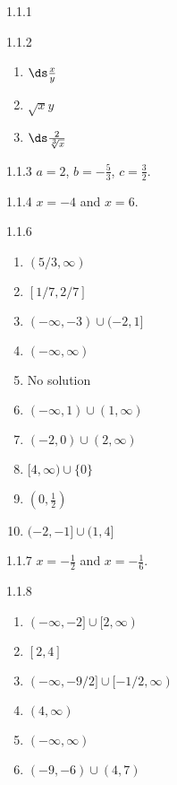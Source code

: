\begin{Answer}{1.1.1}
\end{Answer}
\begin{Answer}{1.1.2}
\begin{enumerate}
	\item	$\ds\frac{x}{y}$
	\item	$\sqrt{x}y$
	\item	$\ds\frac{2}{\sqrt[3]{x}}$
\end{enumerate}
\end{Answer}
\begin{Answer}{1.1.3}
	$a=2$, $b=-\frac{5}{3}$, $c=\frac{3}{2}$.
\end{Answer}
\begin{Answer}{1.1.4}
$x=-4$ and $x=6$.
\end{Answer}
\begin{Answer}{1.1.6}
\begin{enumerate}
	\item	$(5/3,\infty)$
	\item	$[1/7,2/7]$
	\item	$(-\infty,-3)\cup(-2,1]$
	\item	$(-\infty,\infty)$
	\item	No solution
	\item	$(-\infty,1)\cup(1,\infty)$
	\item	$(-2,0)\cup(2,\infty)$
	\item	$[4,\infty)\cup\{0\}$
	\item	$(0,\frac{1}{2})$
	\item	$(-2,-1]\cup(1,4]$
\end{enumerate}
\end{Answer}
\begin{Answer}{1.1.7}
$x=-\frac{1}{2}$ and $x=-\frac{1}{6}$.
\end{Answer}
\begin{Answer}{1.1.8}
\begin{multicols}{2}
\begin{enumerate}
	\item	$(-\infty,-2]\cup[2,\infty)$
	\item	$[2,4]$
	\item	$(-\infty,-9/2]\cup[-1/2,\infty)$
	\item	$(4,\infty)$
	\item	$(-\infty,\infty)$
	\item	$(-9,-6)\cup(4,7)$
\end{enumerate}
\end{multicols}
\end{Answer}
